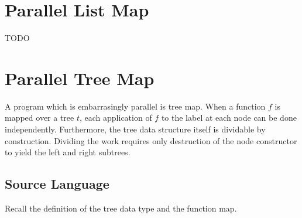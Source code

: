 \section{Parallel List Map}
TODO


\section{Parallel Tree Map}
A program which is embarrasingly parallel is tree map.
When a function $f$ is mapped over a tree $t$, each application of $f$ to the label at each node can be done independently.
Furthermore, the tree data structure itself is dividable by construction.
Dividing the work requires only destruction of the node constructor to yield the left and right subtrees.

\subsection*{Source Language}
Recall the definition of the tree data type and the function map.
